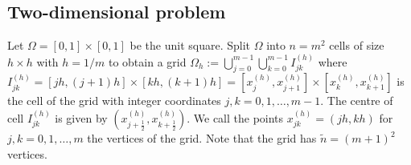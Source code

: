\documentclass[11pt]{article}
\begin{document}
\subsection{Two-dimensional problem}
Let $\Omega = [0,1]\times [0,1]$ be the unit square. Split $\Omega$ into $n=m^2$ cells of size $h\times h$ with $h=1/m$ to obtain a grid \mbox{$\Omega_h := \bigcup_{j=0}^{m-1}\bigcup_{k=0}^{m-1} I_{jk}^{(h)}$} where $I_{jk}^{(h)}=[jh,(j+1)h]\times [kh,(k+1)h]=[x^{(h)}_j,x^{(h)}_{j+1}]\times [x^{(h)}_k,x^{(h)}_{k+1}]$ is the cell of the grid with integer coordinates $j,k=0,1,\dots,m-1$. The centre of cell $I^{(h)}_{jk}$ is given by $(x^{(h)}_{j+\frac{1}{2}},x^{(h)}_{k+\frac{1}{2}})$. We call the points $x^{(h)}_{jk}=(jh,kh)$ for $j,k=0,1,\dots,m$ the vertices of the grid. Note that the grid has $\widetilde{n}=(m+1)^2$ vertices.
\end{document}
